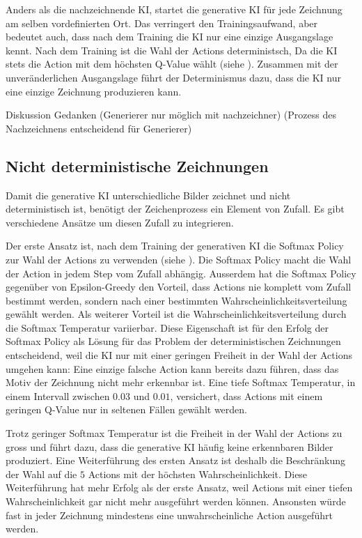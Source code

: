 Anders als die nachzeichnende KI, startet die generative KI für jede Zeichnung
am selben vordefinierten Ort. Das verringert den Trainingsaufwand, aber bedeutet
auch, dass nach dem Training die KI nur eine einzige Ausgangslage kennt. Nach
dem Training ist die Wahl der Actions deterministsch, Da die KI stets die Action
mit dem höchsten Q-Value wählt (siehe ). Zusammen mit
der unveränderlichen Ausgangslage führt der Determinismus dazu, dass die KI nur
eine einzige Zeichnung produzieren kann. 


Diskussion Gedanken
(Generierer nur möglich mit nachzeichner)
(Prozess des Nachzeichnens entscheidend für Generierer)


\subsection{Nicht deterministische Zeichnungen}\label{sub:m_gen_det} Damit die
generative KI unterschiedliche Bilder zeichnet und nicht deterministisch ist,
benötigt der Zeichenprozess ein Element von Zufall. Es gibt verschiedene Ansätze
um diesen Zufall zu integrieren.

Der erste Ansatz ist, nach dem Training der generativen KI die Softmax Policy
zur Wahl der Actions zu verwenden (siehe ). Die Softmax
Policy macht die Wahl der Action in jedem Step vom Zufall abhängig. Ausserdem
hat die Softmax Policy gegenüber von Epsilon-Greedy den Vorteil, dass Actions
nie komplett vom Zufall bestimmt werden, sondern nach einer bestimmten
Wahrscheinlichkeitsverteilung gewählt werden. Als weiterer Vorteil ist die
Wahrscheinlichkeitsverteilung durch die Softmax Temperatur variierbar. Diese
Eigenschaft ist für den Erfolg der Softmax Policy als Lösung für das Problem der
deterministischen Zeichnungen entscheidend, weil die KI nur mit einer geringen
Freiheit in der Wahl der Actions umgehen kann: Eine einzige falsche Action kann
bereits dazu führen, dass das Motiv der Zeichnung nicht mehr erkennbar ist. Eine
tiefe Softmax Temperatur, in einem Intervall zwischen $0.03$ und $0.01$,
versichert, dass Actions mit einem geringen Q-Value nur in seltenen Fällen
gewählt werden.

Trotz geringer Softmax Temperatur ist die Freiheit in der Wahl der Actions zu
gross und führt dazu, dass die generative KI häufig keine erkennbaren Bilder
produziert. Eine Weiterführung des ersten Ansatz ist deshalb die Beschränkung
der Wahl auf die $5$ Actions mit der höchsten Wahrscheinlichkeit. Diese
Weiterführung hat mehr Erfolg als der erste Ansatz, weil Actions mit einer
tiefen Wahrscheinlichkeit gar nicht mehr ausgeführt werden können. Ansonsten
würde fast in jeder Zeichnung mindestens eine unwahrscheinliche Action
ausgeführt werden.

